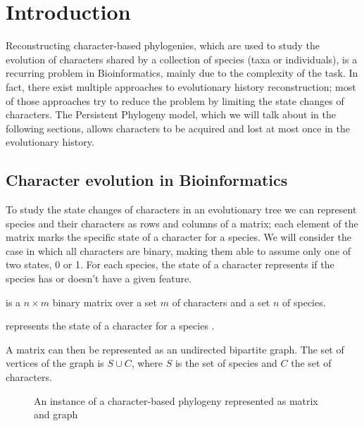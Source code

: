 
\section{Introduction}\label{sec:introduction}

Reconstructing character-based phylogenies, which are used to study the evolution of characters shared by a collection of species (taxa or individuals), is a recurring problem in Bioinformatics, mainly due to the complexity of the task. In fact, there exist multiple approaches to evolutionary history reconstruction; most of those approaches try to reduce the problem by limiting the state changes of characters. The Persistent Phylogeny model, which we will talk about in the following sections, allows characters to be acquired and lost at most once in the evolutionary history.

\subsection{Character evolution in Bioinformatics}\label{ssec:charevo}

To study the state changes of characters in an evolutionary tree we can represent species and their characters as rows and columns of a matrix; each element of the matrix marks the specific state of a character for a species.
We will consider the case in which all characters are binary, making them able to assume only one of two states, 0 or 1. For each species, the state of a character represents if the species has or doesn't have a given feature.

\begin{definition}\label{def:m}
  \m{} is a $n \times m$ binary matrix over a set $m$ of characters and a set $n$ of species.

  \m[i][j] represents the state of a character \character[j] for a species \species[i].
\end{definition}

A matrix \m{} can then be represented as an undirected bipartite graph. The set of vertices of the graph is $S \cup C$, where $S$ is the set of species and $C$ the set of characters.

\begin{figure}[h]
  

  \caption{An instance of a character-based phylogeny represented as matrix and graph}
  \label{fig:1}
\end{figure}

